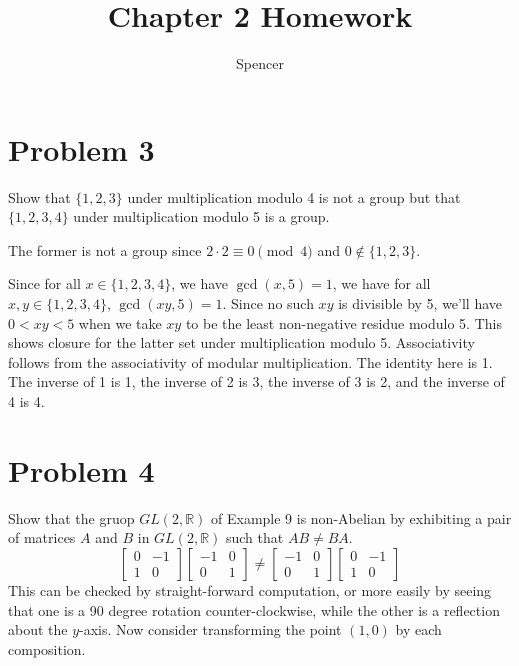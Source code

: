 \documentclass{article}
\title{Chapter 2 Homework}
\author{Spencer}
\begin{document}
\maketitle

\section*{Problem 3}

Show that $\{1, 2, 3\}$ under multiplication modulo 4 is not a group but
that $\{1, 2, 3, 4\}$ under multiplication modulo 5 is a group.

The former is not a group since $2\cdot 2\equiv 0\pmod{4}$ and $0\not\in\{1,2,3\}$.

Since for all $x\in\{1,2,3,4\}$, we have $\gcd(x,5)=1$, we have for all $x,y\in\{1,2,3,4\}$,
$\gcd(xy,5)=1$.  Since no such $xy$ is divisible by 5, we'll have $0<xy<5$ when we take
$xy$ to be the least non-negative residue modulo 5.  This shows closure for the latter
set under multiplication modulo 5.  Associativity follows from the associativity of
modular multiplication.  The identity here is 1.  The inverse of 1 is 1, the inverse
of 2 is 3, the inverse of 3 is 2, and the inverse of 4 is 4.

\section*{Problem 4}

Show that the gruop $GL(2,\mathbb{R})$ of Example 9 is non-Abelian by
exhibiting a pair of matrices $A$ and $B$ in $GL(2,\mathbb{R})$ such that
$AB\neq BA$.
\begin{equation*}
\left[\begin{array}{cc}0&-1\\1&0\end{array}\right]
\left[\begin{array}{cc}-1&0\\0&1\end{array}\right]
\neq
\left[\begin{array}{cc}-1&0\\0&1\end{array}\right]
\left[\begin{array}{cc}0&-1\\1&0\end{array}\right]
\end{equation*}
This can be checked by straight-forward computation, or more easily by seeing that
one is a 90 degree rotation counter-clockwise, while the other is a reflection about
the $y$-axis.  Now consider transforming the point $(1,0)$ by each composition.
\end{document}
